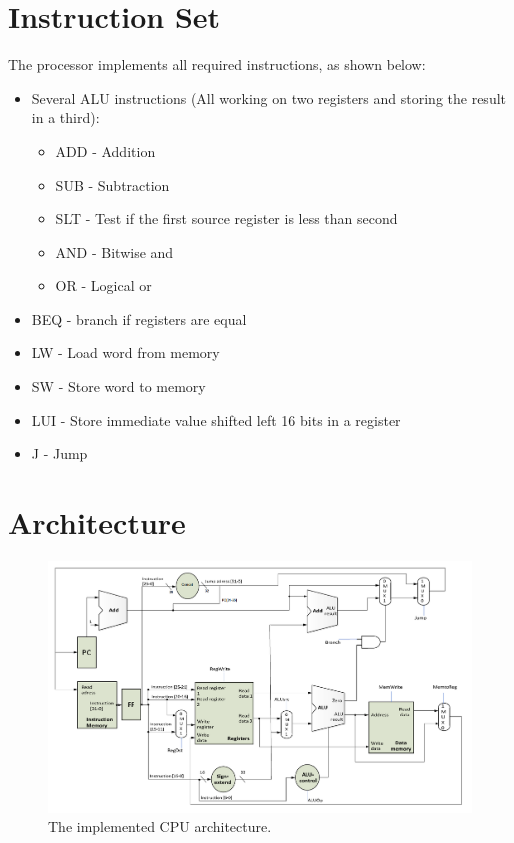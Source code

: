 \section{Instruction Set}

The processor implements all required instructions, as shown below:

\begin{itemize}
    \item Several ALU instructions (All working on two registers and storing the result in a third):
        \begin{itemize}
            \item ADD - Addition
            \item SUB - Subtraction
            \item SLT - Test if the first source register is less than second
            \item AND - Bitwise and
            \item OR  - Logical or
        \end{itemize}
    \item BEQ - branch if registers are equal
    \item LW - Load word from memory
    \item SW - Store word to memory
    \item LUI - Store immediate value shifted left 16 bits in a register
    \item J - Jump
\end{itemize}

\section{Architecture}

\begin{figure}[ht]
    \centering
    \includegraphics[scale=0.3]{figures/cpu2.png}
    \caption{\label{fig:cpuArchitecture}The implemented CPU architecture.} 
\end{figure}

